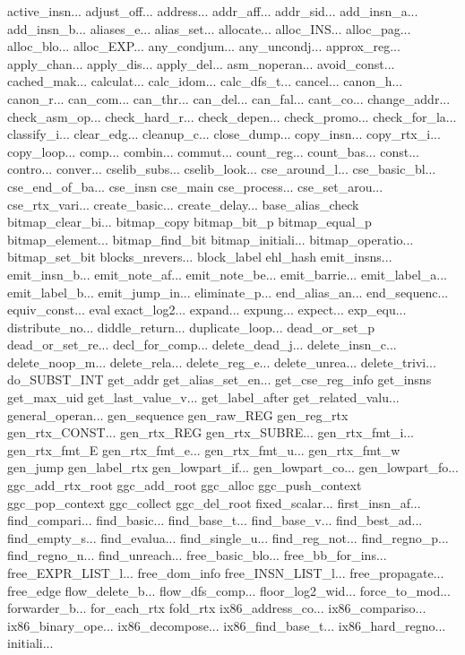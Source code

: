 active_insn...
adjust_off...
address...
addr_aff...
addr_sid...
add_insn_a...
add_insn_b...
aliases_e...
alias_set...
allocate...
alloc_INS...
alloc_pag...
alloc_blo...
alloc_EXP...
any_condjum...
any_uncondj...
approx_reg...
apply_chan...
apply_dis...
apply_del...
asm_noperan...
avoid_const...
cached_mak...
calculat...
calc_idom...
calc_dfs_t...
cancel...
canon_h...
canon_r...
can_com...
can_thr...
can_del...
can_fal...
cant_co...
change_addr...
check_asm_op...
check_hard_r...
check_depen...
check_promo...
check_for_la...
classify_i...
clear_edg...
cleanup_c...
close_dump...
copy_insn...
copy_rtx_i...
copy_loop...
comp...
combin...
commut...
count_reg...
count_bas...
const...
contro...
conver...
cselib_subs...
cselib_look...
cse_around_l...
cse_basic_bl...
cse_end_of_ba...
cse_insn
cse_main
cse_process...
cse_set_arou...
cse_rtx_vari...
create_basic...
create_delay...
base_alias_check
bitmap_clear_bi...
bitmap_copy
bitmap_bit_p
bitmap_equal_p
bitmap_element...
bitmap_find_bit
bitmap_initiali...
bitmap_operatio...
bitmap_set_bit
blocks_nrevers...
block_label
ehl_hash
emit_insns...
emit_insn_b...
emit_note_af...
emit_note_be...
emit_barrie...
emit_label_a...
emit_label_b...
emit_jump_in...
eliminate_p...
end_alias_an...
end_sequenc...
equiv_const...
eval
exact_log2...
expand...
expung...
expect...
exp_equ...
distribute_no...
diddle_return...
duplicate_loop...
dead_or_set_p
dead_or_set_re...
decl_for_comp...
delete_dead_j...
delete_insn_c...
delete_noop_m...
delete_rela...
delete_reg_e...
delete_unrea...
delete_trivi...
do_SUBST_INT
get_addr
get_alias_set_en...
get_cse_reg_info
get_insns
get_max_uid
get_last_value_v...
get_label_after
get_related_valu...
general_operan...
gen_sequence
gen_raw_REG
gen_reg_rtx
gen_rtx_CONST...
gen_rtx_REG
gen_rtx_SUBRE...
gen_rtx_fmt_i...
gen_rtx_fmt_E
gen_rtx_fmt_e...
gen_rtx_fmt_u...
gen_rtx_fmt_w
gen_jump
gen_label_rtx
gen_lowpart_if...
gen_lowpart_co...
gen_lowpart_fo...
ggc_add_rtx_root
ggc_add_root
ggc_alloc
ggc_push_context
ggc_pop_context
ggc_collect
ggc_del_root
fixed_scalar...
first_insn_af...
find_compari...
find_basic...
find_base_t...
find_base_v...
find_best_ad...
find_empty_s...
find_evalua...
find_single_u...
find_reg_not...
find_regno_p...
find_regno_n...
find_unreach...
free_basic_blo...
free_bb_for_ins...
free_EXPR_LIST_l...
free_dom_info
free_INSN_LIST_l...
free_propagate...
free_edge
flow_delete_b...
flow_dfs_comp...
floor_log2_wid...
force_to_mod...
forwarder_b...
for_each_rtx
fold_rtx
ix86_address_co...
ix86_compariso...
ix86_binary_ope...
ix86_decompose...
ix86_find_base_t...
ix86_hard_regno...
initiali...
